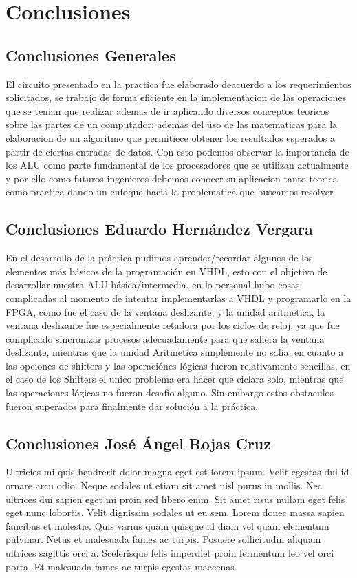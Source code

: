 \section{Conclusiones}
	\subsection{Conclusiones Generales}
	El circuito presentado en la practica fue elaborado deacuerdo a los requerimientos solicitados, se trabajo de forma eficiente en la implementacion de las operaciones que se tenian que realizar ademas de ir aplicando diversos conceptos teoricos sobre las partes de un computador; ademas del uso de las matematicas para la elaboracion de un algoritmo que permitiece obtener los resultados esperados a partir de ciertas entradas de datos. Con esto podemos observar la importancia de los ALU como parte fundamental de los procesadores que se utilizan actualmente y por ello como futuros ingenieros debemos conocer su aplicacion tanto teorica como practica dando un enfoque hacia la problematica que buscamos resolver
	\subsection{Conclusiones Eduardo Hern\'andez Vergara}
		En el desarrollo de la pr\'actica pudimos aprender/recordar algunos de los elementos m\'as b\'asicos de la programaci\'on en VHDL, esto con el objetivo de desarrollar nuestra ALU b\'asica/intermedia, en lo personal hubo cosas complicadas al momento de intentar implementarlas a VHDL y programarlo en la FPGA, como fue el caso de la ventana deslizante, y la unidad aritmetica, la ventana deslizante fue especialmente retadora por los ciclos de reloj, ya que fue complicado sincronizar procesos adecuadamente para que saliera la ventana deslizante, mientras que la unidad Aritmetica simplemente no salia, en cuanto a las opciones de shifters y las operaci\'ones l\'ogicas fueron relativamente sencillas, en el caso de los Shifters el unico problema era hacer que ciclara solo, mientras que las operaciones l\'ogicas no fueron desafio alguno. Sin embargo estos obstaculos fueron superados para finalmente dar soluci\'on a la pr\'actica.
	\subsection{Conclusiones Jos\'e \'Angel Rojas Cruz}
	Ultricies mi quis hendrerit dolor magna eget est lorem ipsum. Velit egestas dui id ornare arcu odio. Neque sodales ut etiam sit amet nisl purus in mollis. Nec ultrices dui sapien eget mi proin sed libero enim. Sit amet risus nullam eget felis eget nunc lobortis. Velit dignissim sodales ut eu sem. Lorem donec massa sapien faucibus et molestie. Quis varius quam quisque id diam vel quam elementum pulvinar. Netus et malesuada fames ac turpis. Posuere sollicitudin aliquam ultrices sagittis orci a. Scelerisque felis imperdiet proin fermentum leo vel orci porta. Et malesuada fames ac turpis egestas maecenas.
